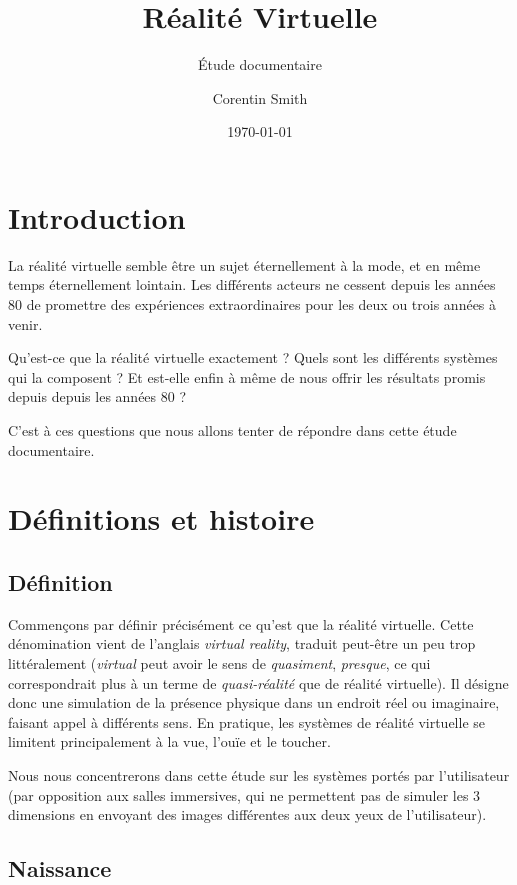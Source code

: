 \documentclass[a4,12pt]{scrartcl}
\title{Réalité Virtuelle}
\subtitle{Étude documentaire}
\author{Corentin Smith}
\date{\today}
\begin{document}
\maketitle

\newpage
\tableofcontents

\newpage
\section{Introduction}

La réalité virtuelle semble être un sujet éternellement à la mode, et en même temps éternellement lointain. Les différents acteurs ne cessent depuis les années 80 de promettre des expériences extraordinaires pour les deux ou trois années à venir.

Qu'est-ce que la réalité virtuelle exactement ? Quels sont les différents systèmes qui la composent ? Et est-elle enfin à même de nous offrir les résultats promis depuis depuis les années 80 ?

C'est à ces questions que nous allons tenter de répondre dans cette étude documentaire.

\section{Définitions et histoire}

\subsection{Définition}

Commençons par définir précisément ce qu'est que la réalité virtuelle. Cette dénomination vient de l'anglais \emph{virtual reality}, traduit peut-être un peu trop littéralement (\emph{virtual} peut avoir le sens de \emph{quasiment}, \emph{presque}, ce qui correspondrait plus à un terme de \emph{quasi-réalité} que de réalité virtuelle). Il désigne donc une simulation de la présence physique dans un endroit réel ou imaginaire, faisant appel à différents sens. En pratique, les systèmes de réalité virtuelle se limitent principalement à la vue, l'ouïe et le toucher.

Nous nous concentrerons dans cette étude sur les systèmes portés par l'utilisateur (par opposition aux salles immersives, qui ne permettent pas de simuler les 3 dimensions en envoyant des images différentes aux deux yeux de l'utilisateur).


\subsection{Naissance}
\end{document}
